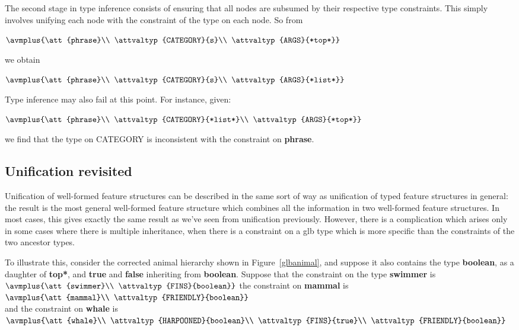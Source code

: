 \documentclass[12pt]{report}
\begin{document}
The second stage in type inference consists of ensuring that
all nodes are subsumed by their respective type constraints.
This simply involves unifying each node with the constraint 
of the type on each node.  So from
\begin{ex}
{\tiny $\avmplus{\att{phrase}\\
\attvaltyp{CATEGORY}{s}\\
\attvaltyp{ARGS}{*top*}}$}
\end{ex}
we obtain
\begin{ex}
{\tiny $\avmplus{\att{phrase}\\
\attvaltyp{CATEGORY}{s}\\
\attvaltyp{ARGS}{*list*}}$}
\end{ex}
Type inference may also fail at this point.  For instance, given:
\begin{ex}
{\tiny $\avmplus{\att{phrase}\\
\attvaltyp{CATEGORY}{*list*}\\
\attvaltyp{ARGS}{*top*}}$}
\end{ex}
we find that the type on CATEGORY is inconsistent
with the constraint on {\bf phrase}.

\subsection{Unification revisited}
\label{wfunif}

Unification of well-formed feature structures can 
be described 
in the same sort of way as unification of typed feature structures
in general: the result is the most general
well-formed feature structure which
combines all the information in two well-formed feature structures.
In most cases, this gives exactly the
same result as we've seen from unification previously.
However, there is a complication which arises only in some cases
where there is multiple inheritance, when there is a constraint
on a glb type which is more specific than the constraints
of the two ancestor types. 

To illustrate this,
consider the corrected
animal hierarchy shown in Figure~\ref{glbanimal},
and suppose it also contains the type {\bf boolean},
as a daughter of {\bf *top*}, and {\bf true} and {\bf false}
inheriting from {\bf boolean}.
Suppose that the constraint on the type {\bf swimmer} is\\
{\tiny
$\avmplus{\att{swimmer}\\
\attvaltyp{FINS}{boolean}}$}
the constraint on
{\bf mammal} is\\
{\tiny $\avmplus{\att{mammal}\\
\attvaltyp{FRIENDLY}{boolean}}$}\\
and the constraint on {\bf whale} is\\
{\tiny $\avmplus{\att{whale}\\
\attvaltyp{HARPOONED}{boolean}\\
\attvaltyp{FINS}{true}\\
\attvaltyp{FRIENDLY}{boolean}}$}
\end{document}
